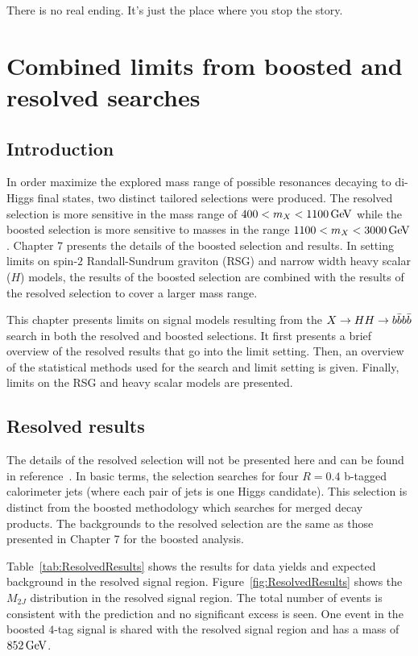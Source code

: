 \begin{savequote}[75mm]
There is no real ending. It’s just the place where you stop the story. 
\end{savequote}

\chapter{Combined limits from boosted and resolved searches}
\label{chap:4bcomb}

\section{Introduction}

In order maximize the explored mass range of possible resonances decaying to di-Higgs final states, two distinct tailored selections were produced. The resolved selection is more sensitive in the mass range of $400 < m_{X} < 1100 \GeV$ while the boosted selection is more sensitive to masses in the range $1100 < m_{X} < 3000 \GeV$. Chapter 7 presents the details of the boosted selection and results. In setting limits on spin-$2$ Randall-Sundrum graviton (RSG) and narrow width heavy scalar ($H$) models, the results of the boosted selection are combined with the results of the resolved selection to cover a larger mass range.

This chapter presents limits on signal models resulting from the $X\to HH \to b\bar{b}b\bar{b}$ search in both the resolved and boosted selections. It first presents a brief overview of the resolved results that go into the limit setting. Then, an overview of the statistical methods used for the search and limit setting is given. Finally, limits on the RSG and heavy scalar models are presented. 

\section{Resolved results}

The details of the resolved selection will not be presented here and can be found in reference~\cite{4bconf}. In basic terms, the selection searches for four $R = 0.4$ b-tagged calorimeter jets (where each pair of jets is one Higgs candidate). This selection is distinct from the boosted methodology which searches for merged decay products. The backgrounds to the resolved selection are the same as those presented in Chapter 7 for the boosted analysis. 

Table~\ref{tab:ResolvedResults} shows the results for data yields and expected background in the resolved signal region. Figure~\ref{fig:ResolvedResults} shows the $M_{2J}$ distribution in the resolved signal region. The total number of events is consistent with the prediction and no significant excess is seen. One event in the boosted $4$-tag signal is shared with the resolved signal region and has a mass of $852 \GeV$. 

